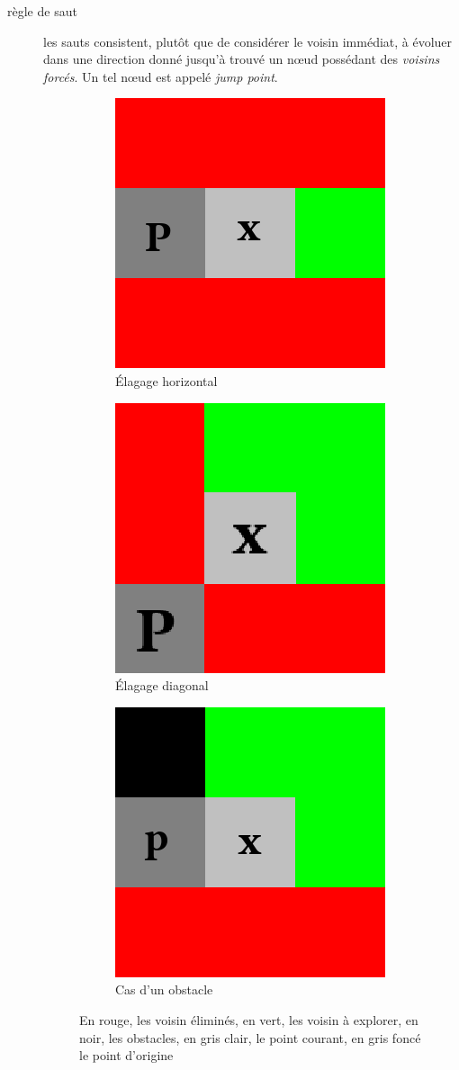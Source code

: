 \documentclass[a4paper,11pt]{article}
\begin{document}
\begin{description}
\item[règle de saut] les sauts consistent, plutôt que de considérer le voisin
    immédiat, à évoluer dans une direction donné jusqu'à trouvé un nœud
    possédant des \emph{voisins forcés}. Un tel nœud est appelé \emph{jump
    point}.
\begin{figure}[h]
\centering
\begin{subfigure}{.3\textwidth}
\centering
\includegraphics[width=0.5\linewidth]{droit.png}
\caption{Élagage horizontal}
\end{subfigure}
\begin{subfigure}{.3\textwidth}
\centering
\includegraphics[width=0.5\linewidth]{diag.png}
\caption{Élagage diagonal}
\end{subfigure}
\begin{subfigure}{.3\textwidth}
\centering
\includegraphics[width=0.5\linewidth]{obstacle.png}
\caption{Cas d'un obstacle}
\end{subfigure}
\caption{En rouge, les voisin éliminés, en vert, les voisin à explorer, en noir,
les obstacles, en gris clair, le point courant, en gris foncé le point d'origine}
\end{figure}


\end{description}
\end{document}
